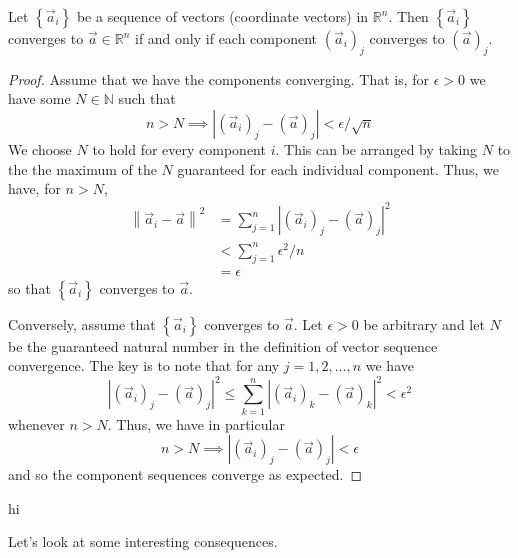 \begin{prop}
Let $ \left\{ \vec{a}_i \right\} $ be a sequence of vectors (coordinate vectors) in $\mathbb{R}^n$. Then $\left\{ \vec{a}_i\right\}$ converges to $\vec{a} \in \mathbb{R}^n$ if and only if each component $\left(\vec{a}_i\right)_j$ converges to $\left(\vec{a}\right)_j$.
\end{prop}
\begin{proof}
Assume that we have the components converging. That is, for $\epsilon >0$ we have some $N \in \mathbb{N}$ such that  \[ n > N \implies \left| \left(\vec{a}_i\right)_j - \left(\vec{a}\right)_j \right| < \epsilon  / \sqrt{n} \]
We choose $N$ to hold for every component $i$. This can be arranged by taking $N$ to the the maximum of the $N$ guaranteed for each individual component. Thus, we have, for $n>N$,
\begin{align*}
	\left\lVert \vec{a}_i - \vec{a} \right\rVert^2 & = \sum_{j=1}^n \left\lvert  \left(\vec{a}_i\right)_j - \left(\vec{a}\right)_j \right\rvert^2 \\
	& < \sum_{j=1}^n \epsilon^2 / n \\
	& = \epsilon
\end{align*}
so that $\left\{ \vec{a}_i \right\}$ converges to $\vec{a}$. 

Conversely, assume that $\left\{ \vec{a}_i \right\}$ converges to $\vec{a}$. Let $\epsilon > 0 $ be arbitrary and let $N$ be the guaranteed natural number in the definition of vector sequence convergence. The key is to note that for any $j = 1,2,\ldots, n$ we have \[ \left\lvert \left(\vec{a}_i\right)_j - \left(\vec{a}\right)_j \right\rvert^2 \leq \sum_{k=1}^n \left\lvert \left(\vec{a}_i\right)_k - \left(\vec{a}\right)_k \right\rvert^2 < \epsilon^2 \] whenever $n>N$. Thus, we have in particular \[ n>N \implies \left\lvert \left(\vec{a}_i\right)_j - \left(\vec{a}\right)_j \right\rvert < \epsilon \] and so the component sequences converge as expected.
\end{proof}

\begin{problem}{1.2}
hi
\end{problem}






Let's look at some interesting consequences.




